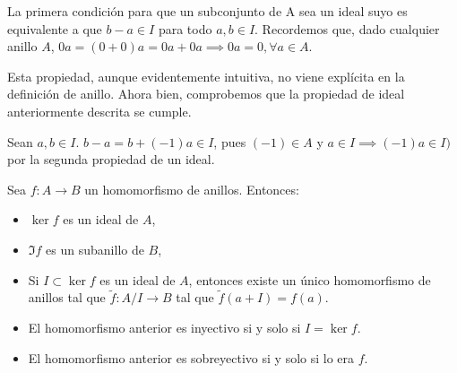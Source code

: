   \begin{obs}
      La primera condición para que un subconjunto de A sea un ideal suyo
      es equivalente a que \(b - a \in I\) para todo \(a, b \in I\). 
      Recordemos que, dado cualquier anillo \(A\), \(0a = (0+0)a = 0a + 0a
      \implies 0a = 0, \forall a \in A\).
      
      Esta propiedad, aunque evidentemente intuitiva, no viene explícita
      en la definición de anillo. Ahora bien, comprobemos que la propiedad
      de ideal anteriormente descrita se cumple.
      
      Sean \(a, b \in I\). \(b - a = b + (-1)a \in I\), pues \((-1) \in A\)
      y \(a \in I \implies (-1)a \in I)\) por la segunda propiedad de un
      ideal. 
  \end{obs}

  \begin{teo}
    Sea \(f:A\longrightarrow B\) un homomorfismo de anillos. Entonces:
    \begin{itemize}
      \item \(\ker f\) es un ideal de \(A\),
      \item \(\Im f\) es un subanillo de \(B\),
      \item Si \(I\subset \ker f\) es un ideal de \(A\), entonces
        existe un único homomorfismo de anillos tal que
        \(\tilde{f}:A/I\longrightarrow B\) tal que \(\tilde{f}(a+I)=f(a)\).
      \item El homomorfismo anterior es inyectivo si y solo si
        \(I=\ker f\).
      \item El homomorfismo anterior es sobreyectivo si y solo si lo era
        \(f\).
    \end{itemize}
  \end{teo}

